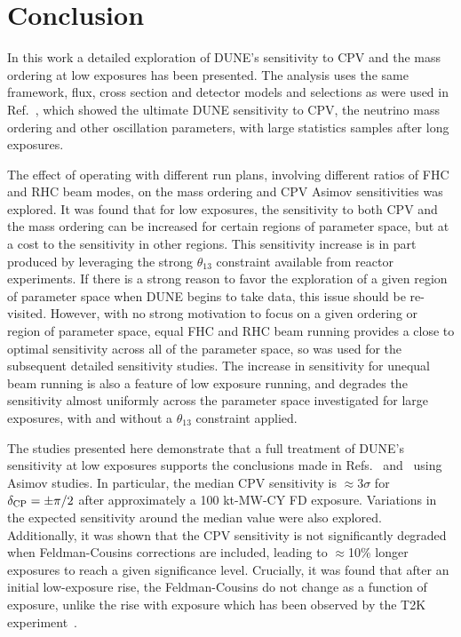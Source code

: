 \section{Conclusion}
\label{sec:conclude}

In this work a detailed exploration of DUNE's sensitivity to CPV and the mass ordering at low exposures has been presented. The analysis uses the same framework, flux, cross section and detector models and selections as were used in Ref.~\cite{Abi:2020qib}, which showed the ultimate DUNE sensitivity to CPV, the neutrino mass ordering and other oscillation parameters, with large statistics samples after long exposures.

The effect of operating with different run plans, involving different ratios of FHC and RHC beam modes, on the mass ordering and CPV Asimov sensitivities was explored. It was found that for low exposures, the sensitivity to both CPV and the mass ordering can be increased for certain regions of parameter space, but at a cost to the sensitivity in other regions. This sensitivity increase is in part produced by leveraging the strong $\theta_{13}$ constraint available from reactor experiments. If there is a strong reason to favor the exploration of a given region of parameter space when DUNE begins to take data, this issue should be re-visited. However, with no strong motivation to focus on a given ordering or region of \deltacp parameter space, equal FHC and RHC beam running provides a close to optimal sensitivity across all of the parameter space, so was used for the subsequent detailed sensitivity studies. The increase in sensitivity for unequal beam running is also a feature of low exposure running, and degrades the sensitivity almost uniformly across the parameter space investigated for large exposures, with and without a $\theta_{13}$ constraint applied.

The studies presented here demonstrate that a full treatment of DUNE's sensitivity at low exposures supports the conclusions made in Refs.~\cite{Abi:2020qib} and~\cite{Abi:2020evt} using Asimov studies. In particular, the median CPV sensitivity is $\approx$3$\sigma$ for $\delta_{\rm CP} = \pm\pi/2$ after approximately a 100 kt-MW-CY FD exposure. Variations in the expected sensitivity around the median value were also explored. Additionally, it was shown that the CPV sensitivity is not significantly degraded when Feldman-Cousins corrections are included, leading to $\approx$10\% longer exposures to reach a given significance level. Crucially, it was found that after an initial low-exposure rise, the Feldman-Cousins \dchisqcrit do not change as a function of exposure, unlike the rise with exposure which has been observed by the T2K experiment~\cite{Abe:2021gky}.

